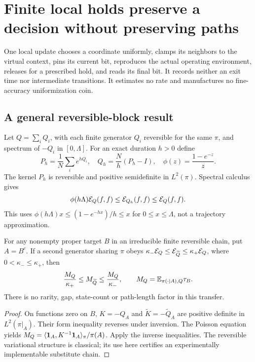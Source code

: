 \section{Finite local holds preserve a decision without preserving paths}
\label{sec:hold}
One local update chooses a coordinate uniformly, clamps its neighbors to the virtual context, pins its current bit, reproduces the actual operating environment, releases for a prescribed hold, and reads its final bit. It records neither an exit time nor intermediate transitions. It estimates no rate and manufactures no fine-accuracy uniformization coin.

\subsection{A general reversible-block result}
Let $Q=\sum_iQ_i$, with each finite generator $Q_i$ reversible for the same $\pi$, and spectrum of $-Q_i$ in $[0,\Lambda]$. For an exact duration $h>0$ define
\begin{equation}
 P_h=\frac1N\sum_i e^{hQ_i},\quad Q_h=\frac Nh(P_h-I),\quad
 \phi(z)=\frac{1-e^{-z}}z.
 \label{eq:holdkernel}
\end{equation}
The kernel $P_h$ is reversible and positive semidefinite in $L^2(\pi)$. Spectral calculus gives
\begin{equation}
 \phi(h\Lambda)\mathcal E_Q(f,f)\le\mathcal E_{Q_h}(f,f)\le\mathcal E_Q(f,f).
 \label{eq:formhold}
\end{equation}
This uses $\phi(h\Lambda)x\le(1-e^{-hx})/h\le x$ for $0\le x\le\Lambda$, not a trajectory approximation.

\begin{theorem}\label{thm:hold}
For any nonempty proper target $B$ in an irreducible finite reversible chain, put $A=B^c$. If a second generator sharing $\pi$ obeys
$\kappa_-\mathcal E_Q\le\mathcal E_{\widetilde Q}\le\kappa_+\mathcal E_Q$, where $0<\kappa_-\le\kappa_+$, then
\begin{equation}
 \frac{M_Q}{\kappa_+}\le M_{\widetilde Q}\le\frac{M_Q}{\kappa_-},\qquad
 M_Q=\mathbb E_{\pi(\cdot\mid A),Q}\tau_B.
 \label{eq:meanhold}
\end{equation}
There is no rarity, gap, state-count or path-length factor in this transfer.
\end{theorem}
\begin{proof}
On functions zero on $B$, $K=-Q_A$ and $\widetilde K=-\widetilde Q_A$ are positive definite in $L^2(\pi|_A)$. Their form inequality reverses under inversion. The Poisson equation yields
$M_Q=\langle\mathbf 1_A,K^{-1}\mathbf 1_A\rangle_\pi/\pi(A)$.
Apply the inverse inequalities. The reversible variational structure is classical; its use here certifies an experimentally implementable substitute chain.
\end{proof}


